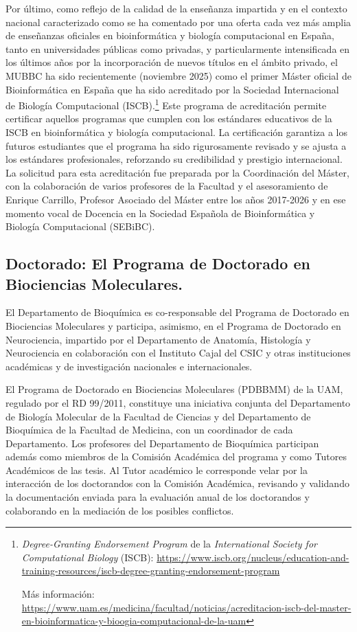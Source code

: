 \documentclass[
  11pt,
  a4paper,
  twoside]{scrreprt}
\begin{document}
Por último, como reflejo de la calidad de la enseñanza impartida y en el
contexto nacional caracterizado como se ha comentado por una oferta cada
vez más amplia de enseñanzas oficiales en bioinformática y biología
computacional en España, tanto en universidades públicas como privadas,
y particularmente intensificada en los últimos años por la incorporación
de nuevos títulos en el ámbito privado, el MUBBC ha sido recientemente
(noviembre 2025) como el primer Máster oficial de Bioinformática en
España que ha sido acreditado por la Sociedad Internacional de Biología
Computacional (ISCB).\footnote{\emph{Degree-Granting Endorsement
  Program} de la \emph{International Society for Computational Biology}
  (ISCB):
  \url{https://www.iscb.org/nucleus/education-and-training-resources/iscb-degree-granting-endorsement-program}
  \newline

  Más información:
  \url{https://www.uam.es/medicina/facultad/noticias/acreditacion-iscb-del-master-en-bioinformatica-y-bioogia-computacional-de-la-uam}}
Este programa de acreditación permite certificar aquellos programas que
cumplen con los estándares educativos de la ISCB en bioinformática y
biología computacional. La certificación garantiza a los futuros
estudiantes que el programa ha sido rigurosamente revisado y se ajusta a
los estándares profesionales, reforzando su credibilidad y prestigio
internacional. La solicitud para esta acreditación fue preparada por la
Coordinación del Máster, con la colaboración de varios profesores de la
Facultad y el asesoramiento de Enrique Carrillo, Profesor Asociado del
Máster entre los años 2017-2026 y en ese momento vocal de Docencia en la
Sociedad Española de Bioinformática y Biología Computacional (SEBiBC).

\subsection{Doctorado: El Programa de Doctorado en Biociencias
Moleculares.}\label{doctorado-el-programa-de-doctorado-en-biociencias-moleculares.}

El Departamento de Bioquímica es co-responsable del Programa de
Doctorado en Biociencias Moleculares y participa, asimismo, en el
Programa de Doctorado en Neurociencia, impartido por el Departamento de
Anatomía, Histología y Neurociencia en colaboración con el Instituto
Cajal del CSIC y otras instituciones académicas y de investigación
nacionales e internacionales.

El Programa de Doctorado en Biociencias Moleculares (PDBBMM) de la UAM,
regulado por el RD 99/2011, constituye una iniciativa conjunta del
Departamento de Biología Molecular de la Facultad de Ciencias y del
Departamento de Bioquímica de la Facultad de Medicina, con un
coordinador de cada Departamento. Los profesores del Departamento de
Bioquímica participan además como miembros de la Comisión Académica del
programa y como Tutores Académicos de las tesis. Al Tutor académico le
corresponde velar por la interacción de los doctorandos con la Comisión
Académica, revisando y validando la documentación enviada para la
evaluación anual de los doctorandos y colaborando en la mediación de los
posibles conflictos.
\end{document}
